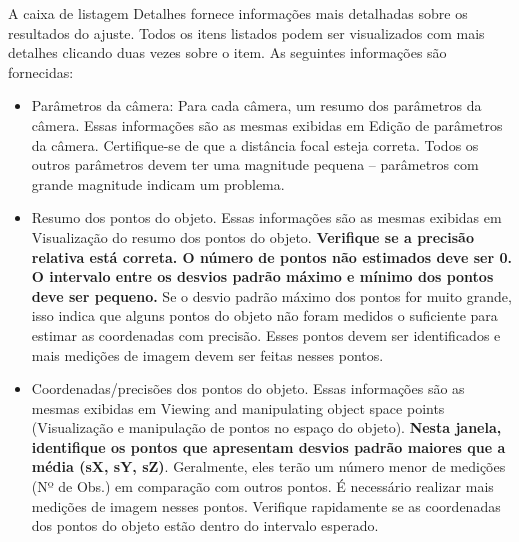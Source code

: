 \documentclass[
  12pt,
  letterpaper,
  DIV=11,
  numbers=noendperiod]{scrreprt}
\providecommand{\tightlist}{%
  \setlength{\itemsep}{0pt}\setlength{\parskip}{0pt}}
\begin{document}
A caixa de listagem Detalhes fornece informações mais detalhadas sobre
os resultados do ajuste. Todos os itens listados podem ser visualizados
com mais detalhes clicando duas vezes sobre o item. As seguintes
informações são fornecidas:

\begin{itemize}
\tightlist
\item
  Parâmetros da câmera: Para cada câmera, um resumo dos parâmetros da
  câmera. Essas informações são as mesmas exibidas em Edição de
  parâmetros da câmera. Certifique-se de que a distância focal esteja
  correta. Todos os outros parâmetros devem ter uma magnitude pequena --
  parâmetros com grande magnitude indicam um problema.
\end{itemize}

\begin{itemize}
\tightlist
\item
  Resumo dos pontos do objeto. Essas informações são as mesmas exibidas
  em Visualização do resumo dos pontos do objeto. \textbf{Verifique se a
  precisão relativa está correta. O número de pontos não estimados deve
  ser 0. O intervalo entre os desvios padrão máximo e mínimo dos pontos
  deve ser pequeno.} Se o desvio padrão máximo dos pontos for muito
  grande, isso indica que alguns pontos do objeto não foram medidos o
  suficiente para estimar as coordenadas com precisão. Esses pontos
  devem ser identificados e mais medições de imagem devem ser feitas
  nesses pontos.
\end{itemize}

\begin{itemize}
\tightlist
\item
  Coordenadas/precisões dos pontos do objeto. Essas informações são as
  mesmas exibidas em Viewing and manipulating object space points
  (Visualização e manipulação de pontos no espaço do objeto).
  \textbf{Nesta janela, identifique os pontos que apresentam desvios
  padrão maiores que a média (sX, sY, sZ)}. Geralmente, eles terão um
  número menor de medições (Nº de Obs.) em comparação com outros pontos.
  É necessário realizar mais medições de imagem nesses pontos. Verifique
  rapidamente se as coordenadas dos pontos do objeto estão dentro do
  intervalo esperado.
\end{itemize}
\end{document}
